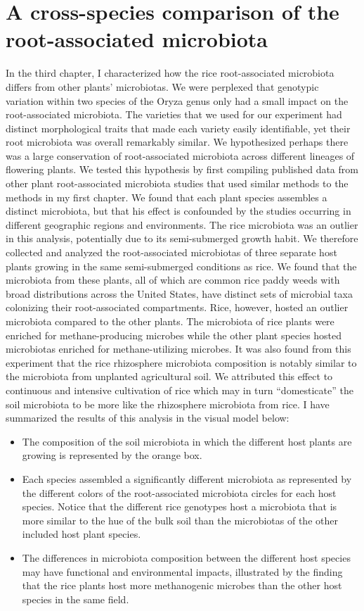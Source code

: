 \section{A cross-species comparison of the root-associated microbiota}
In the third chapter, I characterized how the rice root-associated microbiota differs from other plants' microbiotas. We were perplexed that genotypic variation within two species of the Oryza genus only had a small impact on the root-associated microbiota. The varieties that we used for our experiment had distinct morphological traits that made each variety easily identifiable, yet their root microbiota was overall remarkably similar. We hypothesized perhaps there was a large conservation of root-associated microbiota across different lineages of flowering plants. We tested this hypothesis by first compiling published data from other plant root-associated microbiota studies that used similar methods to the methods in my first chapter. We found that each plant species assembles a distinct microbiota, but that his effect is confounded by the studies occurring in different geographic regions and environments. The rice microbiota was an outlier in this analysis, potentially due to its semi-submerged growth habit. We therefore collected and analyzed the root-associated microbiotas of three separate host plants growing in the same semi-submerged conditions as rice. We found that the microbiota from these plants, all of which are common rice paddy weeds with broad distributions across the United States, have distinct sets of microbial taxa colonizing their root-associated compartments. Rice, however, hosted an outlier microbiota compared to the other plants. The microbiota of rice plants were enriched for methane-producing microbes while the other plant species hosted microbiotas enriched for methane-utilizing microbes. It was also found from this experiment that the rice rhizosphere microbiota composition is notably similar to the microbiota from unplanted agricultural soil. We attributed this effect to continuous and intensive cultivation of rice which may in turn ``domesticate'' the soil microbiota to be more like the rhizosphere microbiota from rice. I have summarized the results of this analysis in the visual model below:

\begin{itemize}
\item The composition of the soil microbiota in which the different host plants are growing is represented by the orange box.
\item Each species assembled a significantly different microbiota as represented by the different colors of the root-associated microbiota circles for each host species. Notice that the different rice genotypes host a microbiota that is more similar to the hue of the bulk soil than the microbiotas of the other included host plant species.
\item The differences in microbiota composition between the different host species may have functional and environmental impacts, illustrated by the finding that the rice plants host more methanogenic microbes than the other host species in the same field.
\end{itemize}

